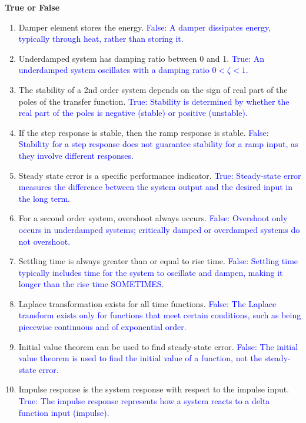 \documentclass[12pt]{article}
\begin{document}
\textbf{True or False}
\begin{enumerate}
	\item Damper element stores the energy. \newline
	      \textcolor{blue}{False: A damper dissipates energy, typically through heat, rather than storing it.}
	\item Underdamped system has damping ratio between 0 and 1. \newline
	      \textcolor{blue}{True: An underdamped system oscillates with a damping ratio \( 0 < \zeta < 1 \).}
	\item The stability of a 2nd order system depends on the sign of real part of the poles of the transfer function. \newline
	      \textcolor{blue}{True: Stability is determined by whether the real part of the poles is negative (stable) or positive (unstable).}
	\item If the step response is stable, then the ramp response is stable. \newline
	      \textcolor{blue}{False: Stability for a step response does not guarantee stability for a ramp input, as they involve different responses.}
	\item Steady state error is a specific performance indicator. \newline
	      \textcolor{blue}{True: Steady-state error measures the difference between the system output and the desired input in the long term.}
	\item For a second order system, overshoot always occurs. \newline
	      \textcolor{blue}{False: Overshoot only occurs in underdamped systems; critically damped or overdamped systems do not overshoot.}
	\item Settling time is always greater than or equal to rise time. \newline
	      \textcolor{blue}{False: Settling time typically includes time for the system to oscillate and dampen, making it longer than the rise time SOMETIMES.}
	\item Laplace transformation exists for all time functions. \newline
	      \textcolor{blue}{False: The Laplace transform exists only for functions that meet certain conditions, such as being piecewise continuous and of exponential order.}
	\item Initial value theorem can be used to find steady-state error. \newline
	      \textcolor{blue}{False: The initial value theorem is used to find the initial value of a function, not the steady-state error.}
	\item Impulse response is the system response with respect to the impulse input. \newline
	      \textcolor{blue}{True: The impulse response represents how a system reacts to a delta function input (impulse).}
\end{enumerate}
\end{document}
